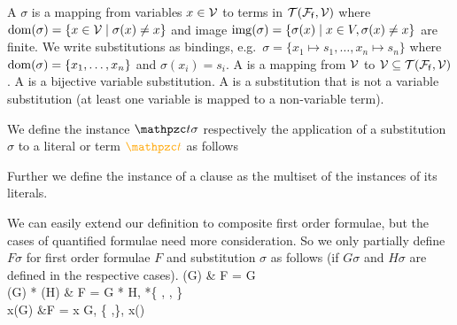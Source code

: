 


\begin{definition}\label{def:substitution}
	A  $\sigma$ is a mapping from variables $x\in\mathcal{V}$ to terms in ${\mathcal{T}(\mathcal{F}_{\mathsf{f}},\mathcal{V})}$
	where $\operatorname{dom}(\sigma) = \{ x\in\mathcal{V}\mid\sigma(x) \neq x \}$
	and image $\operatorname{img}(\sigma) =\{ \sigma(x) \mid x\in V, \sigma(x)\neq x \}$ are finite.
	We write substitutions as bindings, e.g.~$\sigma=\{ x_1\mapsto s_1,\ldots,x_n\mapsto s_n \}$
	where $\operatorname{dom}(\sigma)=\{ x_1,\ldots,x_n \}$ and $\sigma(x_i)=s_i$.
	A  is a mapping from $\mathcal{V}$ to $\mathcal{V}\subseteq{\mathcal{T}(\mathcal{F}_{\mathsf{f}},\mathcal{V})}$.
	A  is a bijective variable substitution.
	A  is a substitution that is not a variable substitution
	(at least one variable is mapped to a non-variable term).
\end{definition}
\begin{definition}
	We define the instance $\mct\sigma$
	respectively the application of a substitution $\sigma$ to a literal or term $\foxt$ as follows

\noindent Further we define the instance of a clause as the multiset of the instances of its literals.
\end{definition}

\begin{definition}
	We can easily extend our definition to composite first order formulae,
	but the cases of quantified formulae need more consideration.
	So we only partially define $F\sigma$ for first order formulae $F$ and substitution $\sigma$ as follows (if $G\sigma$ and $H\sigma$ are defined in the respective cases).
{
		\lnot(G\sigma) & F = \lnot G
		\\
		(G\sigma) * (H\sigma) & F = G * H, *\in \{ \land, \lor, \limp \}\\
		\quantify x(G\sigma) &F = \quantify x G,
		\quantify\in\{ \forall,\exists \},
		x\not\in\domain(\sigma)
	}
\end{definition}

